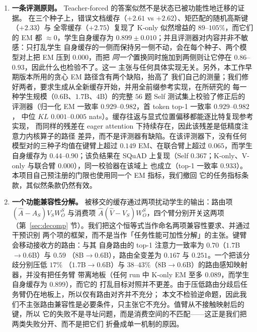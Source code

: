 \documentclass[11pt]{article}
\begin{document}
\begin{enumerate}
\item \textbf{一条评测原则。} Teacher-forced 的答案似然不是状态已被功能性地迁移的证据。
  在三个种子上，错误文档缓存（$+2.61$ vs $+2.62$）、矩匹配的随机高斯键（$+2.33$）与
  全零缓存（$+2.75$）复现了 K-only 似然增益的 $89$--$105\%$，而它们的 EM 都
  $\approx 0$，学生自身缓存为 $0.899\pm0.010$；并且评测器对内容并非不敏感：只打乱学生
  自身缓存的一侧而保持另一侧不动，会在每个种子、两个模型对上把 EM 压到 $0.000$，而把
  \emph{同一个}置换同时施加到两侧则让它停在 $0.86$--$0.93$，因此什么也检验不了。这一
  主张与任何具体实现无关。另外，本工作早期版本所用的贪心 EM 路径含有两个缺陷，抬高了
  我们自己的测量；我们修好两者，要求生成从全新缓存开始，并用全前缀参考实现，在所研究的
  每一种学生规模（$0.6$B、$1.7$B、$4$B）的完整 $56$ 题 Self 测试集上校验了修正后的
  评测器（归一化 EM 一致率 $0.929$--$0.982$，首 token top-1 一致率 $0.929$--$0.982$，
  中位 $KL$ $0.001$--$0.005$ nats）。缓存往返与显式位置偏移都能逐比特复现参考实现，
  而同样的残差在 eager attention 下持续存在，因此该残差是低精度注意力内核算子的路径
  差异，而不是评测器有缺陷。在该评测器下，没有任何模型对的三种子均值在键臂上超过
  $0.149$ EM、在联合臂上超过 $0.065$，而学生自身缓存为 $0.44$--$0.90$；该负结果在
  SQuAD 上复现（Self $0.367$；K-only、V-only 与联合臂 $0.000$），同一校验器在该域上
  也成立（top-1 一致率 $0.933$）。本项目自己预注册的门限也使用同一个 EM 指标，我们撤回
  它的任务指标条款，其似然条款仍然有效。

\item \textbf{一个功能兼容性分解。} 被移交的缓存通过两项扰动学生的输出：路由项
  $(\hat A-A_S)V_SW_O^S$ 与消费项 $\hat A(\hat V-V_S)W_O^S$，四个臂分别开关这两项
  （第~\ref{sec:decomp} 节）。我们把这个恒等式当作命名两项兼容性要求、并通过干预识别
  两个项的框架，而不是当作「任务性能可加性分解」的主张。键臂会移动接收方的路由：与其
  自身路由的 top-1 注意力一致率为 $0.70$（$1.7$B$\to0.6$B）与 $0.59$
  （$8$B$\to0.6$B），路由全变差为 $0.167$ 与 $0.251$。一个把该分歧分别压低 $17\%$
  （$1.7$B$\to0.6$B）与 $38$--$43\%$（$8$B$\to0.6$B）的路由感知映射器，并没有把任务臂
  带离地板（任何 run 中 K-only EM 至多 $0.089$，而学生自身缓存为 $0.899$），而它的
  打乱目标对照并不更差。由于压低路由分歧后任务臂仍在地板上，所以仅有路由对齐并不充分；
  本文不检验逆命题，因此我们不主张路由兼容性是必要条件，只主张它不充分。值臂从不接触映射后的键，所以
  它的失败不是寻址问题，而是消费空间的不匹配——这正是我们把两类失败分开、而不是把它们
  折叠成单一机制的原因。


\end{enumerate}
\end{document}
